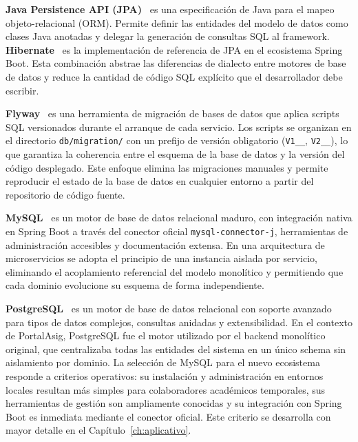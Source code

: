\textbf{Java Persistence API (JPA)}~\cite{jakartapersistence2024} es una especificaci\'{o}n de Java para el mapeo objeto-relacional (ORM). Permite definir las entidades del modelo de datos como clases Java anotadas y delegar la generaci\'{o}n de consultas SQL al framework. \textbf{Hibernate}~\cite{hibernate2024} es la implementaci\'{o}n de referencia de JPA en el ecosistema Spring Boot. Esta combinaci\'{o}n abstrae las diferencias de dialecto entre motores de base de datos y reduce la cantidad de c\'{o}digo SQL expl\'{i}cito que el desarrollador debe escribir.

\textbf{Flyway}~\cite{flyway2024} es una herramienta de migraci\'{o}n de bases de datos que aplica scripts SQL versionados durante el arranque de cada servicio. Los scripts se organizan en el directorio \texttt{db/migration/} con un prefijo de versi\'{o}n obligatorio (\texttt{V1\_\_}, \texttt{V2\_\_}), lo que garantiza la coherencia entre el esquema de la base de datos y la versi\'{o}n del c\'{o}digo desplegado. Este enfoque elimina las migraciones manuales y permite reproducir el estado de la base de datos en cualquier entorno a partir del repositorio de c\'{o}digo fuente.

\textbf{MySQL}~\cite{mysql2024} es un motor de base de datos relacional maduro, con integraci\'{o}n nativa en Spring Boot a trav\'{e}s del conector oficial \texttt{mysql-connector-j}, herramientas de administraci\'{o}n accesibles y documentaci\'{o}n extensa. En una arquitectura de microservicios se adopta el principio de una instancia aislada por servicio, eliminando el acoplamiento referencial del modelo monol\'{i}tico y permitiendo que cada dominio evolucione su esquema de forma independiente.

\textbf{PostgreSQL}~\cite{postgresql2024} es un motor de base de datos relacional con soporte avanzado para tipos de datos complejos, consultas anidadas y extensibilidad. En el contexto de PortalAsig, PostgreSQL fue el motor utilizado por el backend monol\'{i}tico original, que centralizaba todas las entidades del sistema en un \'{u}nico schema sin aislamiento por dominio. La selecci\'{o}n de MySQL para el nuevo ecosistema responde a criterios operativos: su instalaci\'{o}n y administraci\'{o}n en entornos locales resultan m\'{a}s simples para colaboradores acad\'{e}micos temporales, sus herramientas de gesti\'{o}n son ampliamente conocidas y su integraci\'{o}n con Spring Boot es inmediata mediante el conector oficial. Este criterio se desarrolla con mayor detalle en el Cap\'{i}tulo~\ref{ch:aplicativo}.

